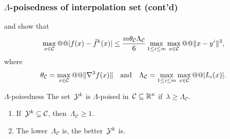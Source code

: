 \documentclass{polyu-presentation}
\newcommand{\iter}[1][]{x\ifthenelse{\equal{#1}{}}{}{^{#1}}}
\newcommand{\lagp}[1][]{L\ifthenelse{\equal{#1}{}}{}{_{#1}}}
\newcommand{\obj}{f}
\newcommand{\objm}[1][]{\hat{f}\ifthenelse{\equal{#1}{}}{}{^{#1}}}
\newcommand{\xpt}[1][]{\mathcal{Y}\ifthenelse{\equal{#1}{}}{}{^{#1}}}
\begin{document}
\begin{frame}
    \frametitle{$\Lambda$-poisedness of interpolation set (cont'd)}

    \textcite{Ciarlet_Raviart_1972} and \textcite{Powell_2001} show that
    \begin{equation*}
        \max_{\iter \in \mathcal{C}} @@ \abs{\obj(\iter) - \objm[k](\iter)} \le \frac{m \theta_{\mathcal{C}} \Lambda_{\mathcal{C}}}{6} \max_{1 \le i \le m} \max_{\iter \in \mathcal{C}} @@ \norm{\iter - y^i}^3,
    \end{equation*}
    where
    \begin{equation*}
        \theta_{\mathcal{C}} = \max_{\iter \in \mathcal{C}} @@ \norm{\nabla^3 \obj(\iter)} \quad \text{and} \quad \Lambda_{\mathcal{C}} = \max_{1 \le i \le m} \max_{\iter \in \mathcal{C}} @@ \abs{\lagp[i](\iter)}.
    \end{equation*}

    \begin{block}{$\Lambda$-poisedness \parencite{Conn_Scheinberg_Vicente_2009b}}
        The set~$\xpt[k]$ is \alert{$\Lambda$-poised} in~$\mathcal{C} \subseteq \mathbb{R}^n$ if~$\lambda \ge \Lambda_{\mathcal{C}}$.
    \end{block}
    
    \medskip

    \begin{block}{}
        \begin{enumerate}
            \item If~$\xpt[k] \subseteq \mathcal{C}$, then~$\Lambda_{\mathcal{C}} \ge 1$.
            \item The lower~$\Lambda_{\mathcal{C}}$ is, the better~$\xpt[k]$ is.
        \end{enumerate}
    \end{block}
\end{frame}
\end{document}
